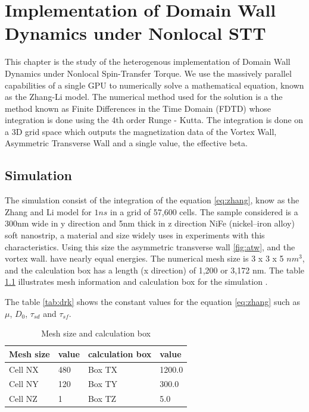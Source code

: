 
\chapter{Implementation of Domain Wall Dynamics under Nonlocal STT} %

\label{Implementation of Domain Wall Dynamics under Nonlocal STT} %


This chapter is the study of the heterogenous implementation of Domain Wall Dynamics under Nonlocal Spin-Transfer Torque. We use the massively parallel capabilities of a single GPU to numerically solve a mathematical equation, known as the Zhang-Li model. The numerical method used for the solution is a the method known as Finite Differences in the Time Domain (FDTD) whose integration is done using the 4th order Runge - Kutta. The integration is done on a 3D grid space which outputs the magnetization data of the Vortex Wall, Asymmetric Transverse Wall and a single value, the effective beta.

\section{Simulation}

The simulation consist of the integration of the equation \ref{eq:zhang}, know as the Zhang and Li model for $1ns$ in a grid of 57,600 cells. The sample considered is a 300nm wide in y direction and 5nm thick in z direction NiFe (nickel–iron alloy) soft nanostrip, a material and size widely uses in experiments with this characteristics. Using this size the asymmetric transverse wall \ref{fig:atw}, and the vortex wall. have nearly equal energies. The numerical mesh size is 3 x 3 x 5 $nm^3$, and the calculation box has a length (x direction) of 1,200 or 3,172 nm. The table \ref{tab:mesh} illustrates mesh information and calculation box for the simulation \cite{claudio}.

The table \ref{tab:drk} shows the constant values for the equation \ref{eq:zhang} such as $\mu$, $D_{0}$, $\tau_{sd}$ and $\tau_{sf}$.

\begin{table}[h]
\centering
\begin{tabular}{| l | l | l | l |}
\hline
Mesh size & value & calculation box & value \\
\hline
Cell NX & 480 & Box TX  & 1200.0   \\
\hline
Cell NY & 120 & Box TY  & 300.0  \\
\hline
Cell NZ &	1 & Box TZ  & 5.0   \\
\hline
\end{tabular}
\caption{Mesh size and calculation box}
\label{tab:mesh}
\end{table}

